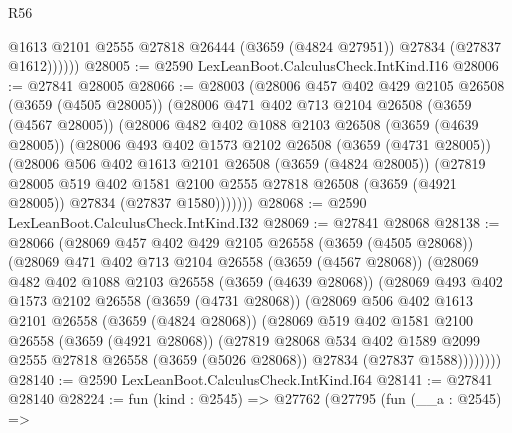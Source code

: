\begin{lexlean}{R56}
\begin{coremodule}
              @1613
              @2101
              @2555
              @27818
              @26444
              (@3659 (@4824 @27951))
              @27834
              (@27837 @1612))))))
@28005 := @2590 LexLeanBoot.CalculusCheck.IntKind.I16
@28006 := @27841 @28005
@28066 := @28003
    (@28006
      @457
      @402
      @429
      @2105
      @26508
      (@3659 (@4505 @28005))
      (@28006
        @471
        @402
        @713
        @2104
        @26508
        (@3659 (@4567 @28005))
        (@28006
          @482
          @402
          @1088
          @2103
          @26508
          (@3659 (@4639 @28005))
          (@28006
            @493
            @402
            @1573
            @2102
            @26508
            (@3659 (@4731 @28005))
            (@28006
              @506
              @402
              @1613
              @2101
              @26508
              (@3659 (@4824 @28005))
              (@27819
                @28005
                @519
                @402
                @1581
                @2100
                @2555
                @27818
                @26508
                (@3659 (@4921 @28005))
                @27834
                (@27837 @1580)))))))
@28068 := @2590 LexLeanBoot.CalculusCheck.IntKind.I32
@28069 := @27841 @28068
@28138 := @28066
    (@28069
      @457
      @402
      @429
      @2105
      @26558
      (@3659 (@4505 @28068))
      (@28069
        @471
        @402
        @713
        @2104
        @26558
        (@3659 (@4567 @28068))
        (@28069
          @482
          @402
          @1088
          @2103
          @26558
          (@3659 (@4639 @28068))
          (@28069
            @493
            @402
            @1573
            @2102
            @26558
            (@3659 (@4731 @28068))
            (@28069
              @506
              @402
              @1613
              @2101
              @26558
              (@3659 (@4824 @28068))
              (@28069
                @519
                @402
                @1581
                @2100
                @26558
                (@3659 (@4921 @28068))
                (@27819
                  @28068
                  @534
                  @402
                  @1589
                  @2099
                  @2555
                  @27818
                  @26558
                  (@3659 (@5026 @28068))
                  @27834
                  (@27837 @1588))))))))
@28140 := @2590 LexLeanBoot.CalculusCheck.IntKind.I64
@28141 := @27841 @28140
@28224 := fun (kind : @2545) =>
  @27762
    (@27795
      (fun (__a : @2545) =>

\end{coremodule}
\end{lexlean}
